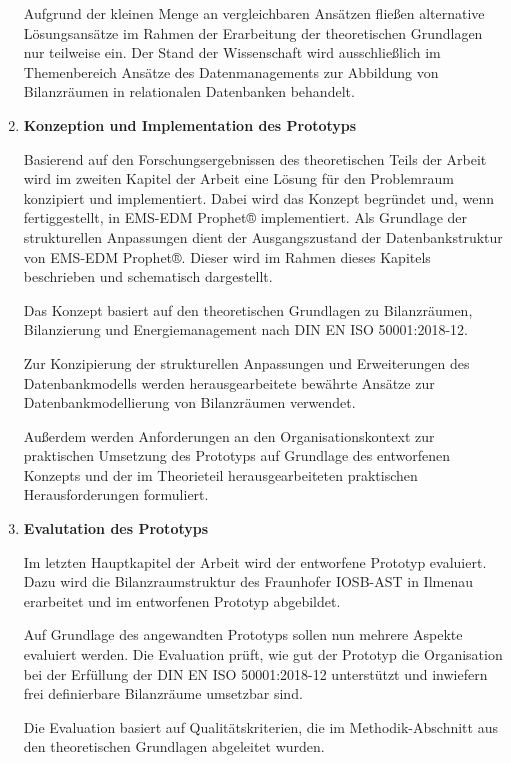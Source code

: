 \begin{enumerate}
    Aufgrund der kleinen Menge an vergleichbaren Ansätzen fließen alternative Lösungsansätze im Rahmen der Erarbeitung der theoretischen Grundlagen nur teilweise ein.
    Der Stand der Wissenschaft wird ausschließlich im Themenbereich Ansätze des Datenmanagements zur Abbildung von Bilanzräumen in relationalen
    Datenbanken behandelt.  

    \item \textbf{Konzeption und Implementation des Prototyps}

    Basierend auf den Forschungsergebnissen des theoretischen Teils der Arbeit wird im zweiten Kapitel der Arbeit eine Lösung für den Problemraum
    konzipiert und implementiert.
    Dabei wird das Konzept begründet und, wenn fertiggestellt, in EMS-EDM Prophet® implementiert.
    Als Grundlage der strukturellen Anpassungen dient der Ausgangszustand der Datenbankstruktur von EMS-EDM Prophet®.
    Dieser wird im Rahmen dieses Kapitels beschrieben und schematisch dargestellt.
    
    Das Konzept basiert auf den theoretischen Grundlagen zu Bilanzräumen, Bilanzierung und Energiemanagement nach DIN EN ISO 50001:2018-12.
    
    Zur Konzipierung der strukturellen Anpassungen und Erweiterungen des Datenbankmodells werden herausgearbeitete bewährte Ansätze zur Datenbankmodellierung von
    Bilanzräumen verwendet.
    
    Außerdem werden Anforderungen an den Organisationskontext zur praktischen Umsetzung des Prototyps auf Grundlage des entworfenen Konzepts und der
    im Theorieteil herausgearbeiteten praktischen Herausforderungen formuliert.

    
    \item \textbf{Evalutation des Prototyps}
    
    Im letzten Hauptkapitel der Arbeit wird der entworfene Prototyp evaluiert.
    Dazu wird die Bilanzraumstruktur des Fraunhofer IOSB-AST in Ilmenau erarbeitet und im entworfenen Prototyp abgebildet.

    Auf Grundlage des angewandten Prototyps sollen nun mehrere Aspekte evaluiert werden.
    Die Evaluation prüft, wie gut der Prototyp die Organisation bei der Erfüllung der DIN EN ISO 50001:2018-12 unterstützt und 
    inwiefern frei definierbare Bilanzräume umsetzbar sind.

    Die Evaluation basiert auf Qualitätskriterien, die im Methodik-Abschnitt aus den theoretischen Grundlagen abgeleitet wurden.
\end{enumerate}